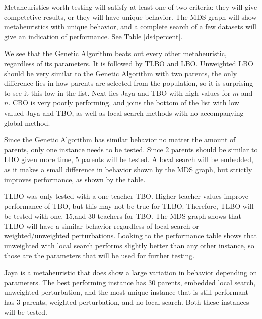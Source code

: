 \documentclass[11pt, letterpaper, onecolumn]{article}
\begin{document}
Metaheuristics worth testing will satisfy at least one of two criteria: they will give competetive results, or they will have unique behavior. The MDS graph will show metaheuristics with unique behavior, and a complete search of a few datasets will give an indication of performance. See Table \ref{ds4percent}.

\begin{table}[htbp]
\end{table}

We see that the Genetic Algorithm beats out every other metaheuristic, regardless of its parameters. It is followed by TLBO and LBO. Unweighted LBO should be very similar to the Genetic Algorithm with two parents, the only difference lies in how parents are selected from the population, so it is surprising to see it this low in the list. Next lies Jaya and TBO with high values for $m$ and $n$. CBO is very poorly performing, and joins the bottom of the list with low valued Jaya and TBO, as well as local search methods with no accompanying global method. 

Since the Genetic Algorithm has similar behavior no matter the amount of parents, only one instance needs to be tested. Since 2 parents should be similar to LBO given more time, 5 parents will be tested. A local search will be embedded, as it makes a small difference in behavior shown by the MDS graph, but strictly improves performance, as shown by the table. 

TLBO was only tested with a one teacher TBO. Higher teacher values improve performance of TBO, but this may not be true for TLBO. Therefore, TLBO will be tested with one, 15,and 30 teachers for TBO. The MDS graph shows that TLBO will have a similar behavior regardless of local search or weighted/unweighted perturbations. Looking to the performance table shows that unweighted with local search performs slightly better than any other instance, so those are the parameters that will be used for further testing. 

Jaya is a metaheuristic that does show a large variation in behavior depending on parameters. The best performing instance has 30 parents, embedded local search, unweighted perturbation, and the most unique instance that is still performant has 3 parents, weighted perturbation, and no local search. Both these instances will be tested. 
\end{document}
